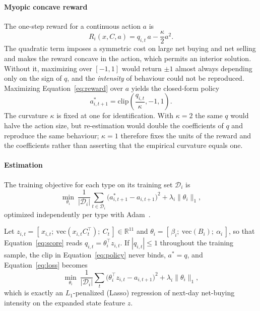 \paragraph{Myopic concave reward}
The one-step reward for a continuous action $a$ is
\begin{equation}
R_i(x,C,a)=q_{i,t}\,a-\frac{\kappa}{2}a^{2}.
\label{eq:reward}
\end{equation}
The quadratic term imposes a symmetric cost on large net buying and net selling
and makes the reward concave in the action, which permits an interior solution.
Without it, maximizing over $[-1,1]$ would return $\pm1$ almost always depending
only on the sign of $q$, and the \emph{intensity} of behaviour could not be
reproduced. Maximizing Equation~\eqref{eq:reward} over $a$ yields the closed-form
policy
\begin{equation}
a^{*}_{i,t+1}=\mathrm{clip}\!\left(\frac{q_{i,t}}{\kappa},-1,1\right).
\label{eq:policy}
\end{equation}
The curvature $\kappa$ is fixed at one for identification. With $\kappa=2$ the
same $q$ would halve the action size, but re-estimation would double the
coefficients of $q$ and reproduce the same behaviour; $\kappa=1$ therefore fixes
the units of the reward and the coefficients rather than asserting that the
empirical curvature equals one.

\paragraph{Estimation}
The training objective for each type on its training set $\mathcal{D}_i$ is
\begin{equation}
\min_{\theta_i}\ \frac{1}{|\mathcal{D}_i|}
\sum_{t\in\mathcal{D}_i}\bigl(a^{*}_{i,t+1}-a_{i,t+1}\bigr)^{2}
+\lambda_i\lVert\theta_i\rVert_1,
\label{eq:loss}
\end{equation}
optimized independently per type with Adam~\cite{kingma2015adam}.

\begin{proposition}
\label{prop:lasso}
Let
$z_{i,t}=[\,x_{i,t};\ \mathrm{vec}(x_{i,t}C_t^{\top});\ C_t\,]\in\mathbb{R}^{11}$
and $\theta_i=[\,\beta_i;\ \mathrm{vec}(B_i);\ \alpha_i\,]$, so that
Equation~\eqref{eq:score} reads $q_{i,t}=\theta_i^{\top}z_{i,t}$. If
$|q_{i,t}|\le 1$ throughout the training sample, the clip in
Equation~\eqref{eq:policy} never binds, $a^{*}=q$, and
Equation~\eqref{eq:loss} becomes
\begin{equation}
\min_{\theta_i}\ \frac{1}{|\mathcal{D}_i|}
\sum_{t}\bigl(\theta_i^{\top}z_{i,t}-a_{i,t+1}\bigr)^{2}
+\lambda_i\lVert\theta_i\rVert_1,
\label{eq:lasso}
\end{equation}
which is exactly an $L_1$-penalized (Lasso) regression of next-day net-buying
intensity on the expanded state feature $z$.
\end{proposition}

